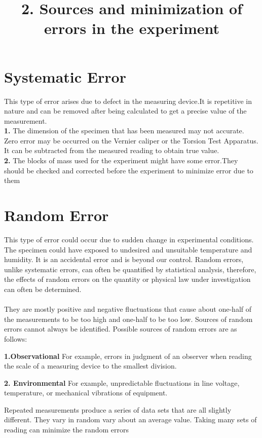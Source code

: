 \documentclass[12pt,a4paper]{article}	%
\title{2. Sources and minimization of errors in the experiment}
\date{\vspace{-5ex}}	%
\begin{document}
\maketitle
	\section{Systematic Error}This type of error arises due to defect in the measuring device.It is repetitive in nature and can be removed after being calculated to get a precise value of the measurement.\\
		\textbf{1.} The dimension of the specimen that has been measured may not accurate. Zero error may be occurred on the Vernier caliper or the Torsion Test Apparatus. It can be subtracted from the measured reading to obtain true value.\\
		\textbf{2.} The blocks of mass used for the experiment might have some error.They should be checked and corrected before the experiment to minimize error due to them
	\section{Random Error}This type of error could occur due to sudden change in experimental conditions. The specimen could have	exposed to undesired and unsuitable temperature and humidity. It is an accidental error and is beyond our control. Random errors, unlike systematic errors, can often be quantified by statistical analysis, therefore, the effects of random errors on the quantity or physical law under investigation can often be determined.\\
	\\They are mostly positive and negative fluctuations that cause about one-half of the measurements to be too high and one-half to be too low. Sources of random errors cannot always be identified. Possible sources of random errors are as follows:
	
	\textbf{1.Observational} For example, errors in judgment of an observer when reading the scale of a measuring device to the smallest division.	
	
	\textbf{2. Environmental} For example, unpredictable fluctuations in line voltage, temperature, or mechanical vibrations of equipment.
	
	Repeated measurements produce a series of data sets that are all slightly different. They vary in random vary about an average value. Taking many sets of reading can minimize the random errors
	
\end{document}
